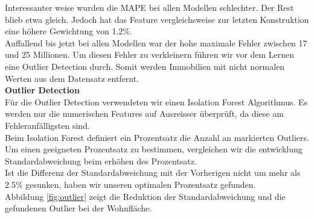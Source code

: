 %
Interessanter weise wurden die MAPE bei allen Modellen schlechter. Der Rest blieb etwa gleich. Jedoch hat das Feature vergleichsweise zur letzten Konstruktion eine höhere Gewichtung von 1.2\%.\\[2ex]
%
Auffallend bis jetzt bei allen Modellen war der hohe maximale Fehler zwischen 17 und 25 Millionen. Um diesen Fehler zu verkleinern führen wir vor dem Lernen eine Outlier Detection durch. Somit werden Immobilien mit nicht normalen Werten aus dem Datensatz entfernt.\\[2ex]
%
\textbf{Outlier Detection}\\
Für die Outlier Detection verwendeten wir einen Isolation Forest Algorithmus. Es werden nur die numerischen Features auf Ausreisser überprüft, da diese am Fehleranfälligsten sind.\\[2ex]
%
Beim Isolation Forest definiert ein Prozentsatz die Anzahl an markierten Outliers. 
Um einen geeigneten Prozentsatz zu bestimmen, vergleichen wir die entwicklung Standardabweichung beim erhöhen des Prozentsatz.\\
Ist die Differenz der Standardabweichung mit der Vorherigen nicht um mehr als 2.5\% gesunken, haben wir unseren optimalen Prozentsatz gefunden.\\
Abbildung \ref{fig:outlier} zeigt die Reduktion der Standardabweichung und die gefundenen Outlier bei der Wohnfläche. 
%
